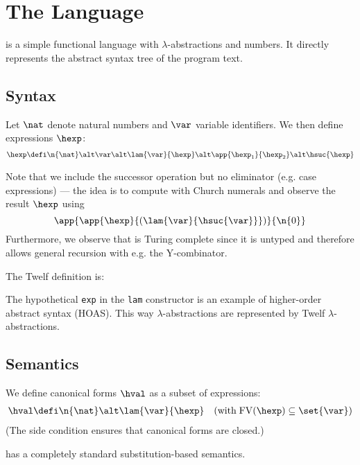 \section{The \textnormal{\hlang} Language}

\hlang is a simple functional language with $\lambda$-abstractions and numbers.
It directly represents the abstract syntax tree of the program text.


\subsection{Syntax}

Let $\nat$ denote natural numbers and $\var$ variable identifiers. We then define \hlang expressions $\hexp$:
\begin{align*}
  \hexp &\defi \n{\nat} \alt \var \alt \lam{\var}{\hexp} \alt \app{\hexp_1}{\hexp_2} \alt \hsuc{\hexp} \\
\end{align*}

Note that we include the successor operation but no eliminator (e.g. case expressions) --- the idea is to compute with Church numerals and observe the result $\hexp$ using
\[
\app{\app{\hexp}{(\lam{\var}{\hsuc{\var}}})}{\n{0}}
\]
Furthermore, we observe that \hlang is Turing complete since it is untyped and therefore allows general recursion with e.g. the Y-combinator.

\Twelf
The Twelf definition is:

The hypothetical \texttt{exp} in the \texttt{lam} constructor is an example of higher-order abstract syntax (HOAS).
This way \hlang $\lambda$-abstractions are represented by Twelf $\lambda$-abstractions.


\subsection{Semantics}

We define canonical forms $\hval$ as a subset of expressions:
\begin{align*}
  \hval &\defi \n{\nat} \alt \lam{\var}{\hexp} \quad (\text{with} \; \mathrm{FV}(\hexp) \subseteq \set{\var}) \\
\end{align*}
(The side condition ensures that canonical forms are closed.)

\hlang has a completely standard substitution-based semantics.

\vspace{0.5cm}

